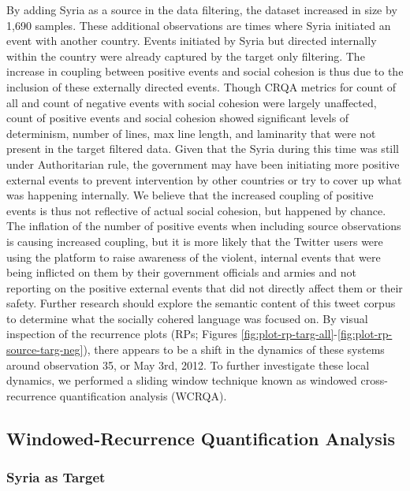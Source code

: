 \documentclass[english,man]{apa6}
\begin{document}
By adding Syria as a source in the data filtering, the dataset increased in size by 1,690 samples. These additional observations are times where Syria initiated an event with another country. Events initiated by Syria but directed internally within the country were already captured by the target only filtering. The increase in coupling between positive events and social cohesion is thus due to the inclusion of these externally directed events. Though CRQA metrics for count of all and count of negative events with social cohesion were largely unaffected, count of positive events and social cohesion showed significant levels of determinism, number of lines, max line length, and laminarity that were not present in the target filtered data. Given that the Syria during this time was still under Authoritarian rule, the government may have been initiating more positive external events to prevent intervention by other countries or try to cover up what was happening internally. We believe that the increased coupling of positive events is thus not reflective of actual social cohesion, but happened by chance. The inflation of the number of positive events when including source observations is causing increased coupling, but it is more likely that the Twitter users were using the platform to raise awareness of the violent, internal events that were being inflicted on them by their government officials and armies and not reporting on the positive external events that did not directly affect them or their safety. Further research should explore the semantic content of this tweet corpus to determine what the socially cohered language was focused on.
By visual inspection of the recurrence plots (RPs; Figures \ref{fig:plot-rp-targ-all}-\ref{fig:plot-rp-source-targ-neg}), there appears to be a shift in the dynamics of these systems around observation 35, or May 3rd, 2012. To further investigate these local dynamics, we performed a sliding window technique known as windowed cross-recurrence quantification analysis (WCRQA).

\hypertarget{windowed-recurrence-quantification-analysis}{%
\subsection{Windowed-Recurrence Quantification Analysis}\label{windowed-recurrence-quantification-analysis}}

\hypertarget{syria-as-target-3}{%
\subsubsection{Syria as Target}\label{syria-as-target-3}}
\end{document}
